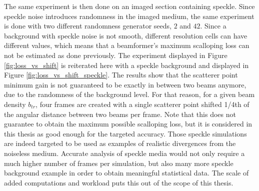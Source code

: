 The same experiment is then done on an imaged section containing speckle. Since speckle noise introduces randomness in the imaged medium, the same experiment is done with two different randomness generator seeds, $2$ and $42$.
Since a background with speckle noise is not smooth, different resolution cells can have different values, which means that a beamformer's maximum scalloping loss can not be estimated as done previously. The experiment displayed in Figure \ref{fig:loss_vs_shift} is reiterated here with a speckle background and displayed in Figure \ref{fig:loss_vs_shift_speckle}. The results show that the scatterer point minimum gain is not guaranteed to be exactly in between two beams anymore, due to the randomness of the background level. For that reason, for a given beam density $b_{tr}$, four frames are created with a single scatterer point shifted 1/4th of the angular distance between two beams per frame. Note that this does not guarantee to obtain the maximum possible scalloping loss, but it is considered in this thesis as good enough for the targeted accuracy. Those speckle simulations are indeed targeted to be used as examples of realistic divergences from the noiseless medium. Accurate analysis of speckle media would not only require a much higher number of frames per simulation, but also many more speckle background example in order to obtain meaningful statistical data. The scale of added computations and workload puts this out of the scope of this thesis.
